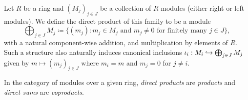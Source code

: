 \begin{definition}
    \label{def:direct-sum-modules}
    Let \(R\) be a ring and \((M_j)_{j \in J}\) be a collection of \(R\)-modules
    (either right or left modules). We define the direct product of this family to
    be a module
    \[
        \bigoplus_{j \in J} M_j \coloneq
        \{(m_j) \colon m_j \in M_j \text{ and } m_j \neq 0
        \text{ for finitely many } j \in J\},
    \]
    with a natural component-wise addition, and multiplication by elements of
    \(R\). Such a structure also naturally induces canonical inclusions \(\iota_i:
    M_i \hookrightarrow \bigoplus_{j \in J} M_j\) given by \(m \mapsto (m_j)_{j \in J}\)
    where \(m_i = m\) and \(m_j = 0\) for \(j \neq i\).
\end{definition}

\begin{theorem}
    \label{thm:direct-sum-product-and-coproduct}
    In the category of modules over a given ring, \emph{direct products} are
    \emph{products} and \emph{direct sums} are \emph{coproducts}.
\end{theorem}

